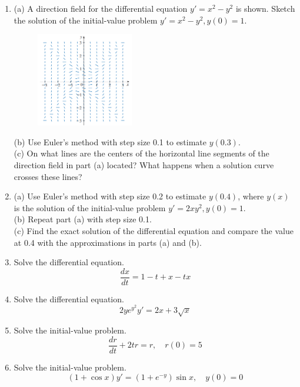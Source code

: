 \documentclass[12pt, a4paper]{article}
\begin{document}
\begin{enumerate}
    \item (a) A direction field for the differential equation $y' = x^2 - y^2$ is shown. Sketch the solution of the initial-value problem $y' = x^2 - y^2, y(0)=1$. \\
    \begin{figure}[htbp] %
        \centering %
       \includegraphics[width=0.4\textwidth]{graph6.png} %
   \end{figure}
    (b) Use Euler's method with step size 0.1 to estimate $y(0.3)$.\\
    (c) On what lines are the centers of the horizontal line segments of the direction field in part (a) located? What happens when a solution curve crosses these lines?

    \item (a) Use Euler's method with step size 0.2 to estimate $y(0.4)$, where $y(x)$ is the solution of the initial-value problem $y' = 2xy^2, y(0)=1$. \\
    (b) Repeat part (a) with step size 0.1.\\
    (c) Find the exact solution of the differential equation and compare the value at 0.4 with the approximations in parts (a) and (b).
    
    \setcounter{enumi}{5} %
    \item Solve the differential equation.
    \[ \frac{dx}{dt} = 1 - t + x - tx \]
    
    \item Solve the differential equation.
    \[ 2ye^{y^2}y' = 2x + 3\sqrt{x} \]
    
    \setcounter{enumi}{8} %
    \item Solve the initial-value problem.
    \[ \frac{dr}{dt} + 2tr = r, \quad r(0)=5 \]
    
    \item Solve the initial-value problem.
    \[ (1+\cos x)y' = (1+e^{-y})\sin x, \quad y(0)=0 \]
    

\end{enumerate}
\end{document}
